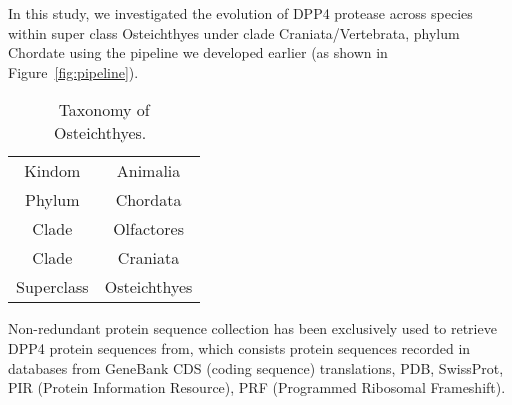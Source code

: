 In this study, we investigated the evolution of DPP4 protease across species within super class Osteichthyes under clade Craniata/Vertebrata, phylum Chordate using the pipeline we developed earlier (as shown in Figure~\ref{fig:pipeline}). 

\begin{table}[h!]
\caption{Taxonomy of Osteichthyes.~\cite{18563158} } 
\label{tab:Tax} 
\centering
    \begin{tabular}{| c | c |}
    \hline
        Kindom & Animalia \\ 
        Phylum & Chordata \\ 
        Clade & Olfactores \\ 
        Clade & Craniata \\ 
        Superclass &  Osteichthyes\\ 
    \hline
    \end{tabular} 
\end{table}

Non-redundant protein sequence collection has been exclusively used to retrieve DPP4 protein sequences from, which consists protein sequences recorded in databases from GeneBank CDS (coding sequence) translations, PDB, SwissProt, PIR (Protein Information Resource), PRF (Programmed Ribosomal Frameshift). 